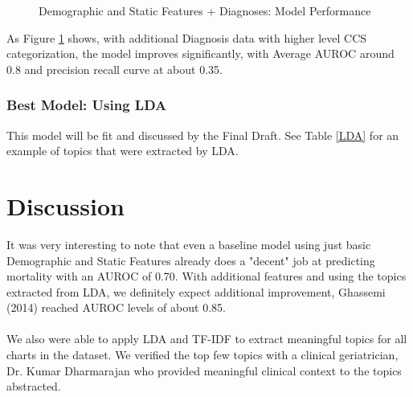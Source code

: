 \documentclass[12pt, final]{article}
\begin{document}
\begin{figure}[H]
\centering     %
{}
\caption{Demographic and Static Features + Diagnoses: Model Performance}
\label{ImprovedModelPerformance}
\end{figure}

As Figure \ref{ImprovedModelPerformance} shows, with additional Diagnosis data with higher level CCS categorization, the model improves significantly, with Average AUROC around 0.8 and precision recall curve at about 0.35.

\subsubsection{Best Model: Using LDA}
This model will be fit and discussed by the Final Draft. See Table \ref{LDA} for an example of topics that were extracted by LDA.

\section{Discussion}
\label{Discussion}
It was very interesting to note that even a baseline model using just basic Demographic and Static Features already does a "decent" job at predicting mortality with an AUROC of 0.70. With additional features and using the topics extracted from LDA, we definitely expect additional improvement, Ghassemi (2014) \cite{Ghassemi} reached AUROC levels of about 0.85.
\\
\\
We also were able to apply LDA and TF-IDF to extract meaningful topics for all charts in the dataset. We verified the top few topics with a clinical geriatrician, Dr. Kumar Dharmarajan who provided meaningful clinical context to the topics abstracted. 
\end{document}
